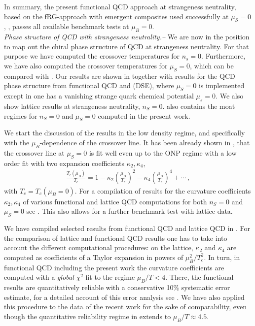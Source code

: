 \documentclass[reprint,twocolumn,superscriptaddress,preprintnumbers,amsmath,amssymb,aps,prd,floatfix]{revtex4-2}
\begin{document}
In summary, the present functional QCD approach at strangeness neutrality, based on the fRG-approach with emergent composites used successfully at $\mu_S=0$, \cite{Fu:2019hdw, Ihssen:2024miv, Pawlowski:2025jpg}, passes all available benchmark tests at $\mu_B=0$. \\[-1.5ex]


\emph{Phase structure of QCD with strangeness neutrality.--}
% 
We are now in the position to map out the chiral phase structure of QCD at strangeness neutrality. For that purpose we have computed the crossover temperatures for $n_s=0$. Furthermore, we have also computed the crossover temperatures for $\mu_S=0$, which can be compared with \cite{Fu:2019hdw, Pawlowski:2025jpg}. 
Our results are shown in  together with results for the QCD phase structure from functional QCD \cite{Fu:2019hdw, Pawlowski:2025jpg} and \cite{Gao:2020fbl} (DSE), where $\mu_S=0$ is implemented except in \cite{Gunkel:2021oya} one has a vanishing strange quark chemical potential $\mu_s=0$. We also show lattice results \cite{HotQCD:2018pds, Borsanyi:2020fev} at strangeness neutrality, $n_S = 0$.  also contains the moat regimes for $n_S=0$ and $\mu_S=0$ computed in the present work. 

We start the discussion of the results in the low density regime, and specifically with the $\mu_B$-dependence of the crossover line. It has been already shown in \cite{Fischer:2014ata, Fu:2019hdw, Gao:2020fbl, Gunkel:2021oya, Pawlowski:2025jpg}, that the crossover line at $\mu_S=0$ is fit well even up to the ONP regime with a low order fit with two expansion coefficients $\kappa_2,\kappa_4$, 
% 
\begin{align}
	\frac{T_c(\mu_B)}{T_c}=1-\kappa_2 \left(\frac{\mu_B}{T_c}\right)^2-\kappa_4 \left(\frac{\mu_B}{T_c}\right)^4+\cdots\,, 
	\label{eq:TcExpansion}
\end{align}
%
with $T_c=T_c(\mu_B=0)$. For a compilation of results for the curvature coefficients $\kappa_2,\kappa_4$ of various functional and lattice QCD computations for both $n_S=0$ and $\mu_S=0$ see \cite{Fischer:2026uni}. This also allows for a further benchmark test with lattice data. 

We have compiled selected results from functional QCD and lattice QCD in . For the comparison of lattice and functional QCD results one has to take into account the different computational procedures: on the lattice, $\kappa_2$ and $\kappa_4$ are computed as coefficients of a Taylor expansion in powers of $\mu^2_B/T_c^2$. In turn, in functional QCD including the present work the curvature coefficients are computed with a \textit{global} $\chi^2$-fit to the regime $\mu_B/T< 4$. There, the functional results are quantitatively reliable with a conservative 10\% systematic error estimate, for a detailed account of this error analysis see \cite{Fischer:2026uni}. We have also applied this procedure to the data of the recent work \cite{Pawlowski:2025jpg} for the sake of comparability, even though the quantitative reliability regime in \cite{Pawlowski:2025jpg} extends to $\mu_B/T \approx 4.5$. 
\end{document}
